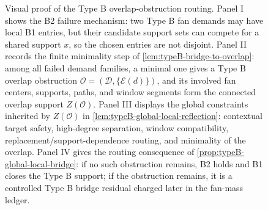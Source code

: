 \documentclass[11pt]{article}
\begin{document}
\begin{figure}[t]
{%
}
\caption[Visual proof of the Type B overlap-obstruction routing]{Visual proof of the Type B overlap-obstruction routing.  Panel I shows the B2 failure mechanism: two Type B fan demands may have local B1 entries, but their candidate support sets can compete for a shared support \(x\), so the chosen entries are not disjoint.  Panel II records the finite minimality step of \cref{lem:typeB-bridge-to-overlap}: among all failed demand families, a minimal one gives a Type B overlap obstruction \(\mathcal O=(\mathcal D,\{\mathcal E(d)\})\), and its involved fan centers, supports, paths, and window segments form the connected overlap support \(Z(\mathcal O)\).  Panel III displays the global constraints inherited by \(Z(\mathcal O)\) in \cref{lem:typeB-global-local-reflection}: contextual target safety, high-degree separation, window compatibility, replacement/support-dependence routing, and minimality of the overlap.  Panel IV gives the routing consequence of \cref{prop:typeB-global-local-bridge}: if no such obstruction remains, B2 holds and B1 closes the Type B support; if the obstruction remains, it is a controlled Type B bridge residual charged later in the fan-mass ledger.}
\label{fig:typeB-overlap-obstruction-routing}
\end{figure}
\end{document}
